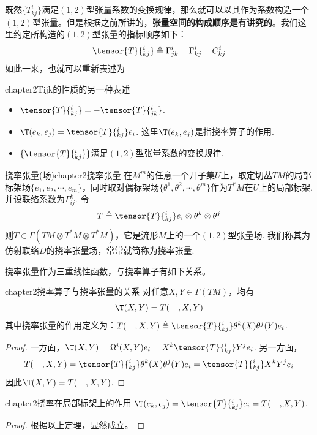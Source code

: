 既然$\{T^{i}_{kj} \}$满足$(1,2)$型张量系数的变换规律，那么就可以以其作为系数构造一个$(1,2)$型张量。但是根据之前所讲的，\textbf{张量空间的构成顺序是有讲究的}。我们这里约定所构造的$(1,2)$型张量的指标顺序如下：
\begin{equation}
\tensor{T}{^i_{kj}}\triangleq \Gamma_{jk}^{i} -\Gamma_{kj}^{i}-C_{kj}^{i}
\end{equation}
如此一来，也就可以重新表述为
\begin{mythm}{}{chapter2Tijk的性质的另一种表述}
	\begin{itemize}
		\item[(1)] $\tensor{T}{^i_{kj}}=-\tensor{T}{^i_{jk}}$.
		\item[(2)] $\T(e_{k},e_{j})=\tensor{T}{^i_{kj}}e_{i}$. 这里$\T(e_{k},e_{j})$是指挠率算子的作用.
		\item[(3)] $\{\tensor{T}{^i_{kj}} \}$满足$(1,2)$型张量系数的变换规律.
	\end{itemize}
\end{mythm}

\begin{mydef}{挠率张量(场)}{chapter2挠率张量}
	在$M^{m}$的任意一个开子集$U$上，取定切丛$TM$的局部标架场$\{e_{1},e_{2},\cdots,e_{m} \}$，同时取对偶标架场$\{\theta^{1},\theta^{2},\cdots,\theta^{m} \}$作为$T^{\ast}M$在$U$上的局部标架. 并设联络系数为$\Gamma^{k}_{ij}$. 令
	\[
	T\triangleq\tensor{T}{^i_{kj}}e_{i}\otimes \theta^{k}\otimes \theta^{j}
	\]
	则$T\in \Gamma(TM\otimes T^{\ast}M\otimes T^{\ast}M)$，它是流形$M$上的一个$(1,2)$型张量场. 我们称其为仿射联络$D$的挠率张量场，常常就简称为挠率张量.
\end{mydef}

挠率张量作为三重线性函数，与挠率算子有如下关系。
\begin{mythm}{}{chapter2挠率算子与挠率张量的关系}
	对任意$X,Y\in \Gamma(TM)$，均有
	\[
	\T(X,Y)=T(\quad,X,Y)
	\]
	其中挠率张量的作用定义为：$T(\quad,X,Y)\triangleq \tensor{T}{^i_{kj}} \theta^{k}(X) \theta^{j}(Y)e_{i}$.
\end{mythm}
\begin{proof}
	一方面，$\T(X,Y)=\Omega ^{i}(X,Y)e_{i}=X^{k}\tensor{T}{^i_{kj}}Y^{j}e_{i}$. 另一方面，
	\[
		T(\quad,X,Y)= \tensor{T}{^i_{kj}} \theta^{k}(X) \theta^{j}(Y)e_{i}=\tensor{T}{^i_{kj}} X^{k} Y^{j}e_{i}
	\]
	因此$\T(X,Y)=T(\quad,X,Y)$.
\end{proof}

\begin{mythm}{}{chapter2挠率在局部标架上的作用}
	$\T(e_{k},e_{j})=\tensor{T}{^i_{kj}}e_{i}=T(\quad,X,Y)$.
\end{mythm}
\begin{proof}
	根据以上定理，显然成立。
\end{proof}

